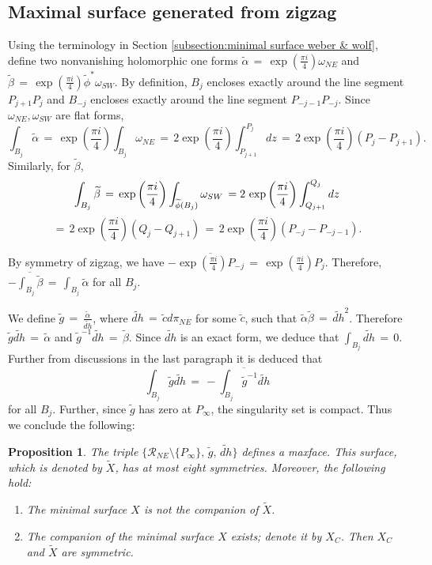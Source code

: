 \documentclass[12pt,epsfig,tikz,multi]{amsart}
\newtheorem{prop}{Proposition}[section]
\numberwithin{equation}{section}
\begin{document}
\subsection{Maximal surface generated from zigzag}\label{Subsec:Maximalsurface tildeX}

Using the terminology in Section \ref{subsection:minimal surface weber & wolf},
define two nonvanishing holomorphic one forms $\widetilde{\alpha}\,=\,\exp({\frac{\pi i }{4}})\omega_{NE}$
and $\widetilde{\beta}\,=\,\exp({\frac{\pi i }{4}})\widetilde{\phi}^*\omega_{SW}$. By definition, $B_j$
encloses exactly around the line segment $P_{j+1} P_{j}$ and $B_{-j}$ encloses exactly around the line segment $P_{-j-1}P_{-j}$. Since $\omega_{NE},\omega_{SW}$ are flat forms,
$$\int_{B_j}\widetilde{\alpha}\,=\, \exp({\frac{\pi i }{4}})\int_{B_j}\omega_{NE}
\,=\,2\exp({\frac{\pi i }{4}})\int_{P_{j+1}}^{P_{j}} dz\,=\,2\exp({\frac{\pi i }{4}})(P_{j}-P_{j+1}).$$
Similarly, for $\widetilde\beta$,
$$
\int_{B_j}\widetilde{\beta}\,=\,\exp\left(\frac{\pi i }{4}\right)\int_{\widetilde{\phi}(B_j)}\omega_{SW}
\,=2\color{black}\,\exp\left(\frac{\pi i }{4}\right)\int_{Q_{j+1}}^{Q_{j}} dz
$$
$$
=\,2\exp\left(\frac{\pi  i }{4}\right)(Q_{j}-Q_{j+1})\,=\,2\exp\left(\frac{\pi i }{4}\right)(P_{-j}-P_{-j-1}).
$$

By symmetry of zigzag, we have $-\overline{\exp({\frac{\pi i }{4}})P_{-j}}
\,=\, \exp({\frac{\pi i }{4}})P_{j}$.
Therefore, $-\overline{\int_{B_j}\widetilde{\beta}}\,=\,\int_{B_j}\widetilde{\alpha}$ for all $B_j$.

We define $\widetilde{g}\,=\,\frac{\widetilde{\alpha}}{\widetilde{dh}}$, where
$\widetilde{dh}\,=\,\widetilde{c}d\pi_{NE}$ for some $\widetilde{c}$, 
such that $\widetilde{\alpha}\widetilde{\beta}\,=\,\widetilde{dh}^2$. Therefore
$\widetilde{g}\widetilde{dh}\,=\,\widetilde{\alpha}$ and $\widetilde{g}^{-1}\widetilde{dh}
\,=\,\widetilde{\beta}$. Since $\widetilde{dh}$ is an exact form, we deduce that $\int_{B_j}\widetilde{dh}
\,=\,0$. Further from discussions in the last paragraph it is deduced that
$$\int_{B_j}\widetilde{g}\widetilde{dh}\,=\,-\overline{\int_{B_j}\widetilde{g}^{-1}\widetilde{dh}}$$
for all $B_j$. Further, since $\widetilde g$ has zero at $P_{\infty}$, the singularity set is compact. Thus we conclude the following:

\begin{prop}\label{propositon:3.1}
The triple $\lbrace\mathcal{R}_{NE}\setminus\lbrace P_{\infty}\rbrace,\,\widetilde{g},\,\widetilde{dh}\rbrace$ defines a maxface.
This surface, which is denoted by $\widetilde{X}$, has at most eight symmetries. Moreover, the following
hold:
\begin{enumerate}
\item The minimal surface $X$ is not the companion of  $\widetilde{X}$.

\item The companion of the minimal surface $X$ exists; denote it by $X_C$. Then $X_C$ and
$\widetilde{X}$ are symmetric.
\end{enumerate}
\end{prop}
\end{document}
